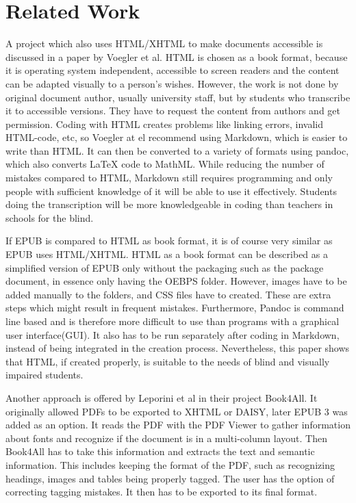 
\chapter{Related Work}
\label{ch:RelatedWork}

A project which also uses HTML/XHTML to make documents accessible is discussed in a paper\cite{markdownSyntax} by Voegler et al. HTML is chosen as a book format, because it is operating system independent, accessible to screen readers and the content can be adapted visually to a person's wishes.  However, the work is not done by original document author, usually university staff, but by students who transcribe it to accessible versions. They have to request the content from authors and get permission. 
Coding with HTML creates problems like linking errors, invalid HTML-code, etc, so Voegler at el recommend using Markdown\cite{Markdown}, which is easier to write than HTML. It can then be converted to a variety of formats using pandoc\cite{Pandoc}, which also converts LaTeX code to MathML.
While reducing the number of mistakes compared to HTML, Markdown still requires programming and only people with sufficient knowledge of it will be able to use it effectively. Students doing the transcription will be more knowledgeable in coding than teachers in schools for the blind. 

If EPUB is compared to HTML as book format, it is of course very similar as EPUB uses HTML/XHTML. HTML as a book format can be described as a simplified version of EPUB only without the packaging such as the package document, in essence only having the OEBPS folder. However, images have to be added manually to the folders, and CSS files have to created. These are extra steps which might result in frequent mistakes. Furthermore, Pandoc is command line based and is therefore more difficult to use than programs with a graphical user interface(GUI). It also has to be run separately after coding in Markdown, instead of being integrated in the creation process. Nevertheless, this paper shows that HTML, if created properly, is suitable to the needs of blind and visually impaired students.

Another approach is offered by Leporini et al in their project Book4All\cite{book4all}. It originally allowed PDFs to be exported to XHTML or DAISY, later EPUB 3 was added as an option. It reads the PDF with the PDF Viewer to gather information about fonts and recognize if the document is in a multi-column layout. Then Book4All has to take this information and extracts the text and semantic information. This includes keeping the format of the PDF, such as recognizing headings, images and tables being properly tagged. The user has the option of correcting tagging mistakes. It then has to be exported to its final format. 

